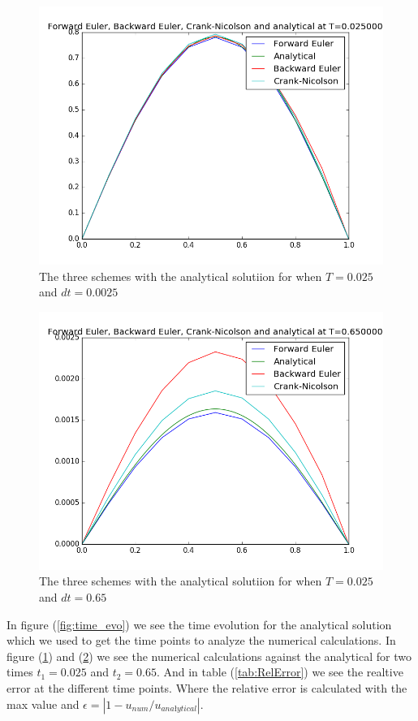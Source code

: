 \documentclass[a4paper,10pt]{article}
\begin{document}
\begin{figure}
  \includegraphics[scale=0.5]{numerical_analytcal_T0025}
    \caption{The three schemes with the analytical solutiion for when $T = 0.025$ and $dt = 0.0025$}
    \label{fig:NumAna0025}
\end{figure}

\begin{figure}
  \includegraphics[scale=0.5]{numerical_analytcal_T065}
    \caption{The three schemes with the analytical solutiion for when $T = 0.025$ and $dt = 0.65$}
    \label{fig:NumAna065}
\end{figure}

In figure (\ref{fig:time_evo}) we see the time evolution for the analytical solution which we used to get the time points to analyze the numerical 
calculations.
In figure (\ref{fig:NumAna0025}) and (\ref{fig:NumAna065}) we see the numerical calculations against the analytical for two times $t_1 = 0.025$
and $t_2 = 0.65$. And in table (\ref{tab:RelError}) we see the realtive error at the different time points. Where the relative error is
calculated with the max value and $\epsilon = |1-u_{num}/u_{anałytical}|$.
\end{document}
